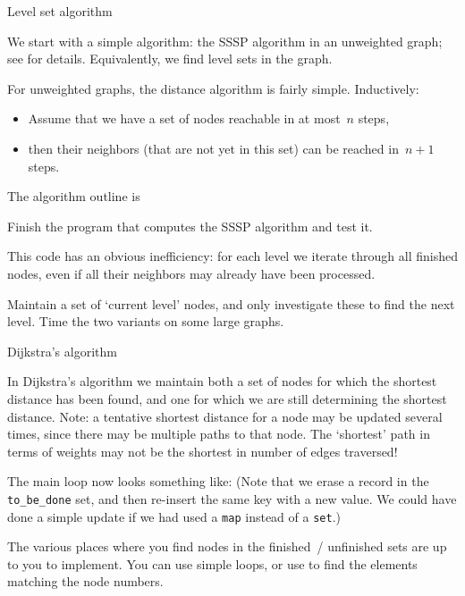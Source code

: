  {Level set algorithm}

We start with a simple algorithm:
the \ac{SSSP} algorithm in an unweighted graph;
see  for details.
Equivalently, we find level sets in the graph.

For unweighted graphs, the distance algorithm is fairly simple.
Inductively:
\begin{itemize}
\item Assume that we have a set of nodes reachable in at most~$n$ steps,
\item then their neighbors (that are not yet in this set)
  can be reached in~$n+1$ steps.
\end{itemize}

The algorithm outline is

\begin{exercise}
  Finish the program that computes the \ac{SSSP} algorithm and test it.
\end{exercise}

This code has an obvious inefficiency:
for each level we iterate through all finished nodes,
even if all their neighbors may already have been processed.

\begin{exercise}
  Maintain a set of `current level' nodes,
  and only investigate these to find the next level.
  Time the two variants on some large graphs.
\end{exercise}

 {Dijkstra's algorithm}

In Dijkstra's algorithm we maintain both a set of nodes
for which the shortest distance has been found,
and one for which we are still determining the shortest distance.
Note: a tentative shortest distance for a node may be updated
several times, since there may be multiple paths to that node.
The `shortest' path in terms of weights may not be the shortest
in number of edges traversed!

The main loop now looks something like:
(Note that we erase a record in the \lstinline{to_be_done} set,
and then re-insert the same key with a new value.
We could have done a simple update if we had used a \lstinline{map}
instead of a \lstinline{set}.)

The various places where you find nodes in the finished~/ unfinished sets
are up to you to implement.
You can use simple loops, or use 
to find the elements matching the node numbers.

